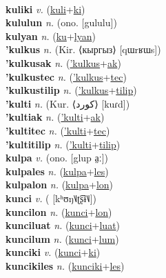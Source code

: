  \label{kulilyan} \\
\textbf{kuliki} \textit{v.} (\hyperref[kuli]{kuli}+\hyperref[ki]{ki})
 \label{kuliki} \\
\textbf{kululun} \textit{n.} (ono. [gululu])
 \label{kululun} \\
\textbf{kulyan} \textit{n.} (\hyperref[ku]{ku}+\hyperref[lyan]{lyan})
 \label{kulyan} \\
\textbf{'kulkus} \textit{n.} (Kir. ⟨кыргыз⟩ [qɯrʁɯs])
 \label{'kulkus} \\
\textbf{'kulkusak} \textit{n.} (\hyperref['kulkus]{'kulkus}+\hyperref[ak]{ak})
 \label{'kulkusak} \\
\textbf{'kulkustec} \textit{n.} (\hyperref['kulkus]{'kulkus}+\hyperref[tec]{tec})
 \label{'kulkustec} \\
\textbf{'kulkustilip} \textit{n.} (\hyperref['kulkus]{'kulkus}+\hyperref[tilip]{tilip})
 \label{'kulkustilip} \\
\textbf{'kulti} \textit{n.} (Kur. ⟨کورد‎⟩ [kuɾd])
 \label{'kulti} \\
\textbf{'kultiak} \textit{n.} (\hyperref['kulti]{'kulti}+\hyperref[ak]{ak})
 \label{'kultiak} \\
\textbf{'kultitec} \textit{n.} (\hyperref['kulti]{'kulti}+\hyperref[tec]{tec})
 \label{'kultitec} \\
\textbf{'kultitilip} \textit{n.} (\hyperref['kulti]{'kulti}+\hyperref[tilip]{tilip})
 \label{'kultitilip} \\
\textbf{kulpa} \textit{v.} (ono. [glup a̤ː])
 \label{kulpa} \\
\textbf{kulpales} \textit{n.} (\hyperref[kulpa]{kulpa}+\hyperref[les]{les})
 \label{kulpales} \\
\textbf{kulpalon} \textit{n.} (\hyperref[kulpa]{kulpa}+\hyperref[lon]{lon})
 \label{kulpalon} \\
\textbf{kunci} \textit{v.} ( [kʰʊŋ˥˩ʈ͡ʂɨ˥˩])
 \label{kunci} \\
\textbf{kuncilon} \textit{n.} (\hyperref[kunci]{kunci}+\hyperref[lon]{lon})
 \label{kuncilon} \\
\textbf{kunciluat} \textit{n.} (\hyperref[kunci]{kunci}+\hyperref[luat]{luat})
 \label{kunciluat} \\
\textbf{kuncilum} \textit{n.} (\hyperref[kunci]{kunci}+\hyperref[lum]{lum})
 \label{kuncilum} \\
\textbf{kunciki} \textit{v.} (\hyperref[kunci]{kunci}+\hyperref[ki]{ki})
 \label{kunciki} \\
\textbf{kuncikiles} \textit{n.} (\hyperref[kunciki]{kunciki}+\hyperref[les]{les})
